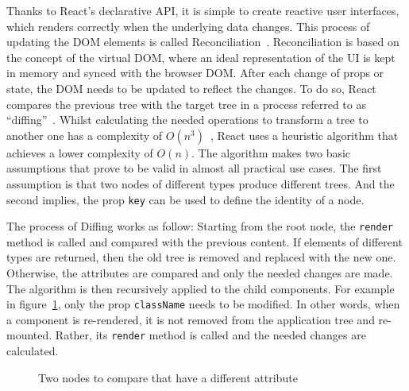 Thanks to React's declarative API, it is simple to create reactive user
interfaces, which renders correctly when the underlying data changes.
This process of updating the DOM elements is called
Reconciliation~\cite{react_reconciliation}. Reconciliation is based on the concept of the
virtual DOM, where an ideal representation of the UI is kept in memory
and synced with the browser DOM. After each change of
props or state, the DOM needs to be updated to reflect the changes. To
do so, React compares the previous tree with the target tree in a
process referred to as ``diffing''~\cite{react_reconciliation}. Whilst calculating the needed
operations to transform a tree to another one has a complexity of
\(O(n^3)\)~\cite{react_reconciliation}, React uses a heuristic algorithm that achieves a lower
complexity of \(O(n)\). The algorithm makes two basic assumptions that
prove to be valid in almost all practical use cases. The first
assumption is that two nodes of different types produce different trees.
And the second implies, the prop \texttt{key} can be used to define the
identity of a node.

The process of Diffing works as follow: Starting from the root node, the
\texttt{render} method is called and compared with the previous content.
If elements of different types are returned, then the old tree is
removed and replaced with the new one. Otherwise, the attributes are
compared and only the needed changes are made. The algorithm is then
recursively applied to the child components. For example in figure~\ref{code_reconciliation_class_name},
only the prop \texttt{className} needs to be modified. In other words,
when a component is re-rendered, it is not removed from the application
tree and re-mounted. Rather, its \texttt{render} method is called and
the needed changes are calculated.

\begin{figure}
\begin{Shaded}
\begin{Highlighting}[]
 \OperatorTok{=} \OperatorTok{=} \KeywordTok{/\textgreater{}}

 \OperatorTok{=} \OperatorTok{=} \KeywordTok{/\textgreater{}}
\end{Highlighting}
\end{Shaded}
\caption{Two nodes to compare that have a different attribute}
\label{code_reconciliation_class_name}
\end{figure}


